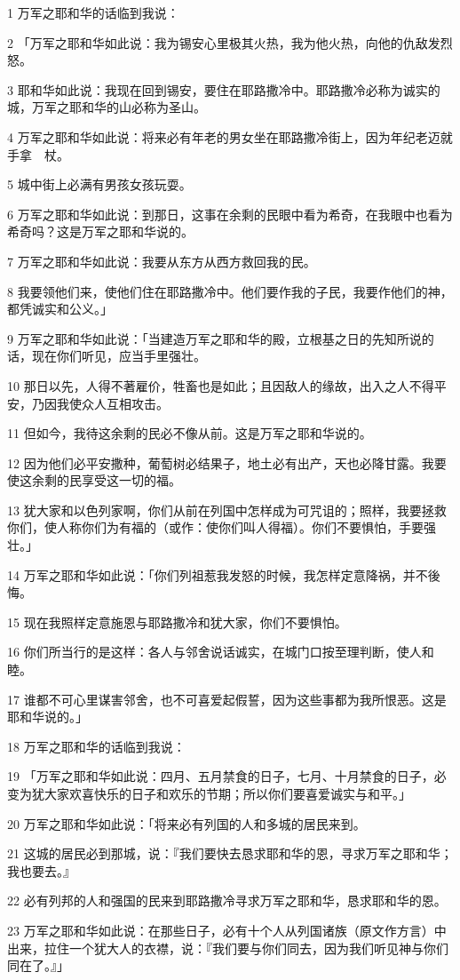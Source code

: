 \par 1 万军之耶和华的话临到我说：
\par 2 「万军之耶和华如此说：我为锡安心里极其火热，我为他火热，向他的仇敌发烈怒。
\par 3 耶和华如此说：我现在回到锡安，要住在耶路撒冷中。耶路撒冷必称为诚实的城，万军之耶和华的山必称为圣山。
\par 4 万军之耶和华如此说：将来必有年老的男女坐在耶路撒冷街上，因为年纪老迈就手拿　杖。
\par 5 城中街上必满有男孩女孩玩耍。
\par 6 万军之耶和华如此说：到那日，这事在余剩的民眼中看为希奇，在我眼中也看为希奇吗？这是万军之耶和华说的。
\par 7 万军之耶和华如此说：我要从东方从西方救回我的民。
\par 8 我要领他们来，使他们住在耶路撒冷中。他们要作我的子民，我要作他们的神，都凭诚实和公义。」
\par 9 万军之耶和华如此说：「当建造万军之耶和华的殿，立根基之日的先知所说的话，现在你们听见，应当手里强壮。
\par 10 那日以先，人得不著雇价，牲畜也是如此；且因敌人的缘故，出入之人不得平安，乃因我使众人互相攻击。
\par 11 但如今，我待这余剩的民必不像从前。这是万军之耶和华说的。
\par 12 因为他们必平安撒种，葡萄树必结果子，地土必有出产，天也必降甘露。我要使这余剩的民享受这一切的福。
\par 13 犹大家和以色列家啊，你们从前在列国中怎样成为可咒诅的；照样，我要拯救你们，使人称你们为有福的（或作：使你们叫人得福）。你们不要惧怕，手要强壮。」
\par 14 万军之耶和华如此说：「你们列祖惹我发怒的时候，我怎样定意降祸，并不後悔。
\par 15 现在我照样定意施恩与耶路撒冷和犹大家，你们不要惧怕。
\par 16 你们所当行的是这样：各人与邻舍说话诚实，在城门口按至理判断，使人和睦。
\par 17 谁都不可心里谋害邻舍，也不可喜爱起假誓，因为这些事都为我所恨恶。这是耶和华说的。」
\par 18 万军之耶和华的话临到我说：
\par 19 「万军之耶和华如此说：四月、五月禁食的日子，七月、十月禁食的日子，必变为犹大家欢喜快乐的日子和欢乐的节期；所以你们要喜爱诚实与和平。」
\par 20 万军之耶和华如此说：「将来必有列国的人和多城的居民来到。
\par 21 这城的居民必到那城，说：『我们要快去恳求耶和华的恩，寻求万军之耶和华；我也要去。』
\par 22 必有列邦的人和强国的民来到耶路撒冷寻求万军之耶和华，恳求耶和华的恩。
\par 23 万军之耶和华如此说：在那些日子，必有十个人从列国诸族（原文作方言）中出来，拉住一个犹大人的衣襟，说：『我们要与你们同去，因为我们听见神与你们同在了。』」

